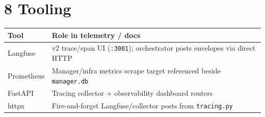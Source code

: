 \section{8 Tooling}\label{tooling}

\begin{longtable}[]{@{}
  >{\raggedright\arraybackslash}p{}
  >{\raggedright\arraybackslash}p{}@{}}
\toprule\noalign{}
Tool & Role in telemetry / docs \\
\midrule\noalign{}
\endhead
\bottomrule\noalign{}
\endlastfoot
Langfuse & v2 trace/span UI (\texttt{:3001}); orchestrator posts envelopes via direct HTTP \\
Prometheus & Manager/infra metrics scrape target referenced beside \texttt{manager.db} \\
FastAPI & Tracing collector + observability dashboard routers \\
httpx & Fire-and-forget Langfuse/collector posts from \texttt{tracing.py} \\
\end{longtable}
